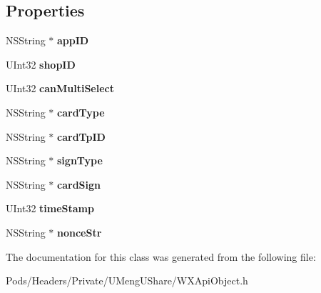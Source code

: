 \subsection*{Properties}
\begin{DoxyCompactItemize}
\item 
\mbox{\label{interface_w_x_choose_card_req_a39b810dbee027337900e8e1c4b829653}} 
N\+S\+String $\ast$ {\bfseries app\+ID}
\item 
\mbox{\label{interface_w_x_choose_card_req_acd9747d420467bc7a2f8fe0fe7f56b1a}} 
U\+Int32 {\bfseries shop\+ID}
\item 
\mbox{\label{interface_w_x_choose_card_req_a3ce9619532b9cfc0d9f12ad442b42e16}} 
U\+Int32 {\bfseries can\+Multi\+Select}
\item 
\mbox{\label{interface_w_x_choose_card_req_a4bf59d78e279995a412454b6105a507c}} 
N\+S\+String $\ast$ {\bfseries card\+Type}
\item 
\mbox{\label{interface_w_x_choose_card_req_a116ebddab7f6e6b1976ad7da76859c27}} 
N\+S\+String $\ast$ {\bfseries card\+Tp\+ID}
\item 
\mbox{\label{interface_w_x_choose_card_req_a84705b3f89420040a1ef66f30ccdb916}} 
N\+S\+String $\ast$ {\bfseries sign\+Type}
\item 
\mbox{\label{interface_w_x_choose_card_req_acc2efbc46b623bcf32d09fa4a95f539f}} 
N\+S\+String $\ast$ {\bfseries card\+Sign}
\item 
\mbox{\label{interface_w_x_choose_card_req_a05b15668f5dc3656d19fb7e1f021701d}} 
U\+Int32 {\bfseries time\+Stamp}
\item 
\mbox{\label{interface_w_x_choose_card_req_a44c0d274904d9a75e020125307948fec}} 
N\+S\+String $\ast$ {\bfseries nonce\+Str}
\end{DoxyCompactItemize}


The documentation for this class was generated from the following file\+:\begin{DoxyCompactItemize}
\item 
Pods/\+Headers/\+Private/\+U\+Meng\+U\+Share/W\+X\+Api\+Object.\+h\end{DoxyCompactItemize}

